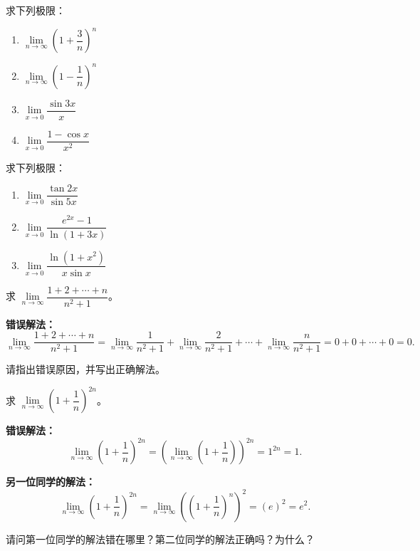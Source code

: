 \documentclass{ctexart}
\begin{document}
\begin{example}[加减结构中的错误示例]
\begin{exercise}求下列极限：
\begin{enumerate}
\item \(\lim\limits_{n\to\infty} \left(1 + \dfrac{3}{n}\right)^n\)
\item \(\lim\limits_{n\to\infty} \left(1 - \dfrac{1}{n}\right)^n\)
\item \(\lim\limits_{x\to 0} \dfrac{\sin 3x}{x}\)
\item \(\lim\limits_{x\to 0} \dfrac{1 - \cos x}{x^2}\)
\end{enumerate}
\end{exercise}

\begin{exercise}求下列极限：
\begin{enumerate}
\item \(\lim\limits_{x\to 0} \dfrac{\tan 2x}{\sin 5x}\)
\item \(\lim\limits_{x\to 0} \dfrac{e^{2x} - 1}{\ln(1+3x)}\)
\item \(\lim\limits_{x\to 0} \dfrac{\ln(1 + x^2)}{x \sin x}\)
\end{enumerate}
\end{exercise}

\begin{exercise}
求 \(\lim\limits_{n\to\infty} \dfrac{1 + 2 + \cdots + n}{n^2 + 1}\)。

\textbf{错误解法：}
\[
\lim_{n\to\infty} \dfrac{1 + 2 + \cdots + n}{n^2 + 1} = \lim_{n\to\infty} \dfrac{1}{n^2+1} + \lim_{n\to\infty} \dfrac{2}{n^2+1} + \cdots + \lim_{n\to\infty} \dfrac{n}{n^2+1} = 0 + 0 + \cdots + 0 = 0.
\]

请指出错误原因，并写出正确解法。
\end{exercise}

\begin{exercise}
求 \(\lim\limits_{n\to\infty} \left(1 + \dfrac{1}{n}\right)^{2n}\)。

\textbf{错误解法：}
\[
\lim_{n\to\infty} \left(1 + \dfrac{1}{n}\right)^{2n} = \left(\lim_{n\to\infty} \left(1 + \dfrac{1}{n}\right)\right)^{2n} = 1 ^{2n}=1.
\]

\textbf{另一位同学的解法：}
\[
\lim_{n\to\infty} \left(1 + \dfrac{1}{n}\right)^{2n} = \lim_{n\to\infty} \left(\left(1 + \dfrac{1}{n}\right)^n\right)^2 = (e)^2 = e^2.
\]

请问第一位同学的解法错在哪里？第二位同学的解法正确吗？为什么？
\end{exercise}


\end{example}
\end{document}
